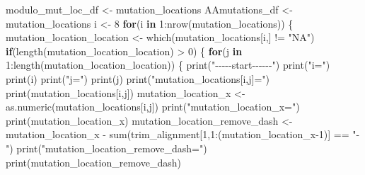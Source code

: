 \documentclass[
]{article}
\newenvironment{Shaded}{\begin{snugshade}}{\end{snugshade}}
\newcommand{\ControlFlowTok}[1]{\textcolor[rgb]{0.13,0.29,0.53}{\textbf{#1}}}
\newcommand{\DecValTok}[1]{\textcolor[rgb]{0.00,0.00,0.81}{#1}}
\newcommand{\FunctionTok}[1]{\textcolor[rgb]{0.00,0.00,0.00}{#1}}
\newcommand{\NormalTok}[1]{#1}
\newcommand{\OtherTok}[1]{\textcolor[rgb]{0.56,0.35,0.01}{#1}}
\newcommand{\SpecialCharTok}[1]{\textcolor[rgb]{0.00,0.00,0.00}{#1}}
\newcommand{\StringTok}[1]{\textcolor[rgb]{0.31,0.60,0.02}{#1}}
\begin{document}
\begin{Shaded}
\begin{Highlighting}[]
\NormalTok{modulo\_mut\_loc\_df }\OtherTok{\textless{}{-}}\NormalTok{ mutation\_locations }
\NormalTok{AAmutations\_df }\OtherTok{\textless{}{-}}\NormalTok{ mutation\_locations}
\NormalTok{i }\OtherTok{\textless{}{-}} \DecValTok{8}
\ControlFlowTok{for}\NormalTok{(i }\ControlFlowTok{in} \DecValTok{1}\SpecialCharTok{:}\FunctionTok{nrow}\NormalTok{(mutation\_locations))}
\NormalTok{\{}
\NormalTok{  mutation\_location\_location }\OtherTok{\textless{}{-}} \FunctionTok{which}\NormalTok{(mutation\_locations[i,] }\SpecialCharTok{!=} \StringTok{"NA"}\NormalTok{)}
  \ControlFlowTok{if}\NormalTok{(}\FunctionTok{length}\NormalTok{(mutation\_location\_location) }\SpecialCharTok{\textgreater{}} \DecValTok{0}\NormalTok{)}
\NormalTok{  \{}
    \ControlFlowTok{for}\NormalTok{(j }\ControlFlowTok{in} \DecValTok{1}\SpecialCharTok{:}\FunctionTok{length}\NormalTok{(mutation\_location\_location))}
\NormalTok{    \{}
      \FunctionTok{print}\NormalTok{(}\StringTok{"{-}{-}{-}{-}{-}start{-}{-}{-}{-}{-}{-}"}\NormalTok{)}
      \FunctionTok{print}\NormalTok{(}\StringTok{"i="}\NormalTok{)}
      \FunctionTok{print}\NormalTok{(i)}
      \FunctionTok{print}\NormalTok{(}\StringTok{"j="}\NormalTok{)}
      \FunctionTok{print}\NormalTok{(j)}
      \FunctionTok{print}\NormalTok{(}\StringTok{"mutation\_locations[i,j]="}\NormalTok{)}
      \FunctionTok{print}\NormalTok{(mutation\_locations[i,j])}
\NormalTok{      mutation\_location\_x }\OtherTok{\textless{}{-}} \FunctionTok{as.numeric}\NormalTok{(mutation\_locations[i,j]) }
      \FunctionTok{print}\NormalTok{(}\StringTok{"mutation\_location\_x="}\NormalTok{)}
      \FunctionTok{print}\NormalTok{(mutation\_location\_x)}
\NormalTok{      mutation\_location\_remove\_dash }\OtherTok{\textless{}{-}}\NormalTok{ mutation\_location\_x }\SpecialCharTok{{-}} 
        \FunctionTok{sum}\NormalTok{(trim\_alignment[}\DecValTok{1}\NormalTok{,}\DecValTok{1}\SpecialCharTok{:}\NormalTok{(mutation\_location\_x}\DecValTok{{-}1}\NormalTok{)] }\SpecialCharTok{==} \StringTok{"{-}"}\NormalTok{)}
      \FunctionTok{print}\NormalTok{(}\StringTok{"mutation\_location\_remove\_dash="}\NormalTok{)}
      \FunctionTok{print}\NormalTok{(mutation\_location\_remove\_dash)}
      

\end{Highlighting}
\end{Shaded}
\end{document}
